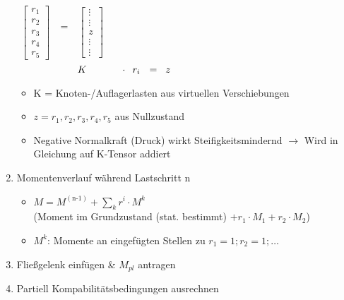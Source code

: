 \documentclass[fleqn,twoside]{article}
\begin{document}
\begin{enumerate}
                $ \begin{smallmatrix} \phantom{r_1} \\\begin{bmatrix}  r_1 \\ r_2 \\ r_3 \\ r_4 \\ r_5 \end{bmatrix} \end{smallmatrix}$
                $=$
                $ \begin{smallmatrix} \phantom{r_1} \\\begin{bmatrix}  \vdots \\ \vdots \\ z \\ \vdots \\ \vdots\end{bmatrix} \end{smallmatrix}$\\
                $\hspace*{2.15cm} K \hspace*{1.2cm} \cdot \hspace*{0.18cm} r_i \hspace*{0.23cm} = \hspace*{0.2cm} z$ 
                        \begin{itemize} 
                            \item K = Knoten-/Auflagerlasten aus virtuellen Verschiebungen 
                            \item $z = r_1,r_2,r_3,r_4,r_5$ aus Nullzustand
                            \item Negative Normalkraft (Druck) wirkt Steifigkeitsmindernd $\rightarrow$ Wird in Gleichung auf K-Tensor addiert
                        \end{itemize}
           \item Momentenverlauf während Lastschritt n
                \begin{itemize}
                    \item $M = M^{(\text{n-1})} + \sum_k r^i \cdot M^k$\\
                        (Moment im Grundzustand (stat. bestimmt) $+ r_1 \cdot M_1 + r_2 \cdot M_2$)
                    \item $M^k$: Momente an eingefügten Stellen zu $r_1 = 1; r_2 = 1; \ldots$
                \end{itemize}
            \item Fließgelenk einfügen \& $M_{pl}$ antragen
            \item Partiell Kompabilitätsbedingungen ausrechnen
        \end{enumerate}
\end{document}
